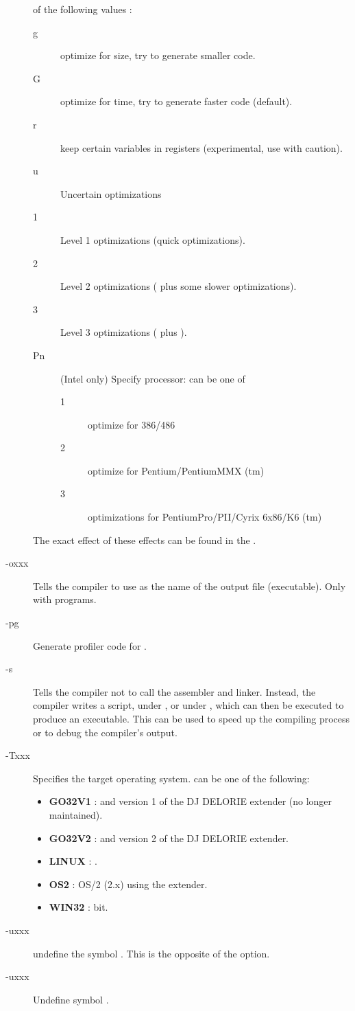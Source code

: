 \documentclass{report}
\begin{document}
\begin{description}
of the following values :
\begin{description}
\item[g] optimize for size, try to generate smaller code.
\item[G] optimize for time, try to generate faster code (default).
\item[r] keep certain variables in registers (experimental, use with
caution).
\item[u] Uncertain optimizations
\item[1] Level 1 optimizations (quick optimizations).
\item[2] Level 2 optimizations ( plus some slower optimizations).
\item[3] Level 3 optimizations ( plus ).
\item[Pn] (Intel only) Specify processor:  can be one of
\begin{description}
\item[1] optimize for 386/486
\item[2] optimize for Pentium/PentiumMMX (tm)
\item[3] optimizations for PentiumPro/PII/Cyrix 6x86/K6 (tm)
\end{description}
\end{description}
The exact effect of these effects can be found in the \progref.
\item [-oxxx] Tells the compiler to use  as the name of the output
file (executable). Only with programs.
\item [-pg]  Generate profiler code for .
\item [-s]  Tells the compiler not to call the assembler and linker.
Instead, the compiler writes a script,  under \dos, or
 under \linux, which can then be executed to produce an
executable. This can be used to speed up the compiling process or to debug
the compiler's output.
\item[-Txxx]  Specifies the target operating system.  can be one of
the following:
\begin{itemize}
\item \textbf{GO32V1} : \dos and version 1 of the DJ DELORIE extender (no longer maintained).
\item \textbf{GO32V2} : \dos and version 2 of the DJ DELORIE extender.
\item \textbf{LINUX} : \linux.
\item \textbf{OS2} : OS/2 (2.x) using the  extender.
\item \textbf{WIN32} :  bit.
\end{itemize}
\item [-uxxx]  undefine the symbol . This is the opposite
of the  option.
\item [-uxxx]  Undefine symbol .


\end{description}
\end{document}
